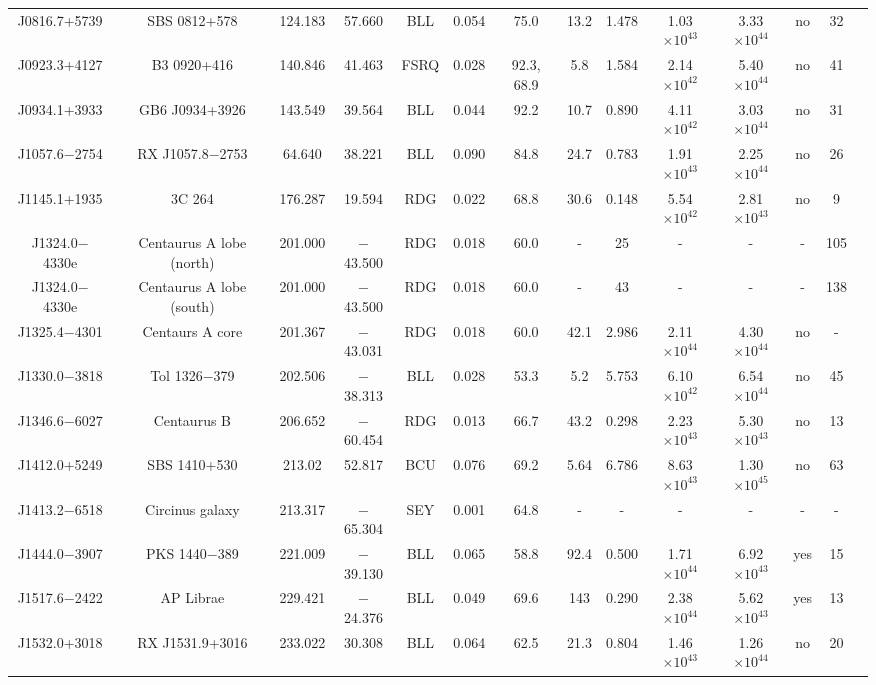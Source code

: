 \documentclass{aastex6}
\begin{document}
\begin{table}
{\begin{tabular}{cccccccccccccc}
J0816.7+5739 & SBS 0812+578 & 124.183 & 57.660 & BLL & 0.054 & 75.0 & 13.2 & 1.478 & 1.03$\times10^{43}$ & 3.33$\times10^{44}$ &no & 32 \\
%
J0923.3+4127 & B3 0920+416 & 140.846 & 41.463 & FSRQ & 0.028 & 92.3, 68.9 & 5.8 & 1.584 & 2.14$\times10^{42}$ & 5.40$\times10^{44}$ & no & 41 \\
%
J0934.1+3933 & GB6 J0934+3926 & 143.549 & 39.564 & BLL & 0.044 & 92.2 & 10.7 & 0.890 & 4.11$\times10^{42}$ & 3.03$\times10^{44}$ & no & 31 \\
%
J1057.6$-$2754 & RX J1057.8$-$2753 & 64.640 & 38.221 & BLL & 0.090 & 84.8 & 24.7 & 0.783 & 1.91$\times10^{43}$ & 2.25$\times10^{44}$ & no & 26 \\
%
J1145.1+1935 & 3C 264 & 176.287 & 19.594 & RDG & 0.022 & 68.8 & 30.6 & 0.148 & 5.54$\times10^{42}$ & 2.81$\times10^{43}$ & no & 9 \\
%
J1324.0$-$4330e & Centaurus A lobe (north) & 201.000 & $-$43.500 & RDG & 0.018 & 60.0 & - & 25 &   - & - & - & 105\\
%
J1324.0$-$4330e & Centaurus A lobe (south) & 201.000 & $-$43.500 & RDG & 0.018 & 60.0 & - & 43 &  - & - & - & 138\\
%
J1325.4$-$4301 & Centaurs A core &  201.367 & $-$43.031 & RDG & 0.018 & 60.0 & 42.1 & 2.986 & 2.11$\times10^{44}$ & 4.30$\times10^{44}$ & no & - \\
%
J1330.0$-$3818 & Tol 1326$-$379 & 202.506 & $-$38.313 & BLL & 0.028 & 53.3 & 5.2 & 5.753 & 6.10$\times10^{42}$ & 6.54$\times10^{44}$ & no & 45 \\
%
J1346.6$-$6027 & Centaurus B & 206.652 & $-$60.454 & RDG & 0.013 & 66.7 & 43.2 & 0.298 & 2.23$\times10^{43}$ & 5.30$\times10^{43}$ & no & 13 \\
%
J1412.0+5249 & SBS 1410+530 & 213.02 & 52.817 & BCU & 0.076 & 69.2 & 5.64 & 6.786 & 8.63$\times10^{43}$ & 1.30$\times10^{45}$ & no & 63 \\
%
J1413.2$-$6518 & Circinus galaxy & 213.317 & $-$65.304 & SEY & 0.001 & 64.8 & - & - & - & - & - & - \\
%
J1444.0$-$3907 & PKS 1440$-$389 & 221.009 & $-$39.130 & BLL & 0.065 & 58.8 & 92.4 & 0.500 & 1.71$\times10^{44}$ & 6.92$\times10^{43}$ & yes & 15 \\
%
J1517.6$-$2422 & AP Librae & 229.421 & $-$24.376 & BLL & 0.049 & 69.6 & 143 & 0.290 & 2.38$\times10^{44}$ & 5.62$\times10^{43}$ & yes & 13 \\
%
J1532.0+3018 & RX J1531.9+3016 & 233.022 & 30.308 & BLL & 0.064 & 62.5 & 21.3 & 0.804 & 1.46$\times10^{43}$ & 1.26$\times10^{44}$ & no & 20 \\

\end{tabular}}
\end{table}
\end{document}
